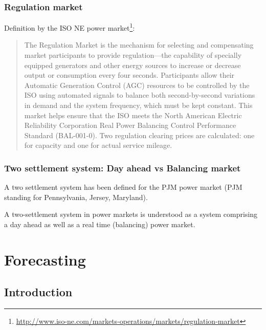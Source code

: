 

\subsubsection{Regulation market}

Definition by the ISO NE power market\footnote{\url{http://www.iso-ne.com/markets-operations/markets/regulation-market}}:

\begin{quote}
The Regulation Market is the mechanism for selecting and compensating market participants to provide regulation—the capability of specially equipped generators and other energy sources to increase or decrease output or consumption every four seconds. Participants allow their Automatic Generation Control (AGC) resources to be controlled by the ISO using automated signals to balance both second-by-second variations in demand and the system frequency, which must be kept constant. This market helps ensure that the ISO meets the North American Electric Reliability Corporation Real Power Balancing Control Performance Standard (BAL-001-0). Two regulation clearing prices are calculated: one for capacity and one for actual service mileage.
\end{quote}




\subsubsection{Two settlement system: Day ahead vs Balancing market}

A two settlement system has been defined for the PJM power market (PJM standing for Pennsylvania, Jersey, Maryland)\cite{lambert2001creating}. 

A two-settlement system in power markets is understood as a system comprising a day ahead as well as a real time (balancing) power market\cite{lambert2001creating}. 




\section{Forecasting}

\subsection{Introduction}

